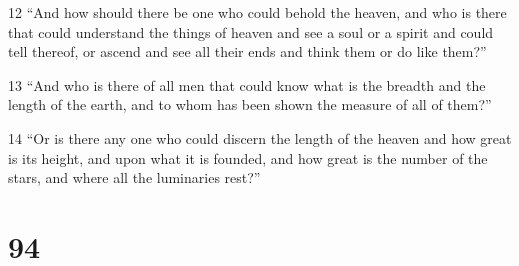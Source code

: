 \par 12 “And how should there be one who could behold the heaven, and who is there that could understand the things of heaven and see a soul or a spirit and could tell thereof, or ascend and see all their ends and think them or do like them?”
\par 13 “And who is there of all men that could know what is the breadth and the length of the earth, and to whom has been shown the measure of all of them?”
\par 14 “Or is there any one who could discern the length of the heaven and how great is its height, and upon what it is founded, and how great is the number of the stars, and where all the luminaries rest?”



\chapter{94}

